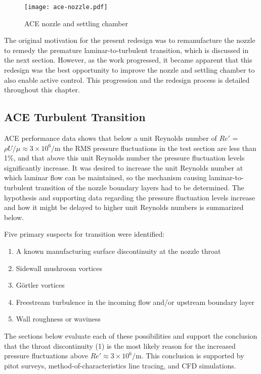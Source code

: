 \begin{figure}[ht!]
    \centering
    \texttt{[image: ace-nozzle.pdf]}
    \caption{ACE nozzle and settling chamber}
    \label{fig:ace-nozzle}
\end{figure}

The original motivation for the present redesign was to remanufacture the nozzle to remedy the premature laminar-to-turbulent transition, which is discussed in the next section. However, as the work progressed, it became apparent that this redesign was the best opportunity to improve the nozzle and settling chamber to also enable active control. This progression and the redesign process is detailed throughout this chapter.

\subsection{ACE Turbulent Transition}

ACE performance data \cite{aceturb,mai-dis,neel-dis,leidy-dis} shows that below a unit Reynolds number of $Re'$ = $\rho U/\mu \approx 3 \times 10^6/\mathrm{m}$ the RMS pressure fluctuations in the test section are less than 1\%, and that above this unit Reynolds number the pressure fluctuation levels significantly increase. It was desired to increase the unit Reynolds number at which laminar flow can be maintained, so the mechanism causing laminar-to-turbulent transition of the nozzle boundary layers had to be determined. The hypothesis and supporting data regarding the pressure fluctuation levels increase and how it might be delayed to higher unit Reynolds numbers is summarized below.

Five primary suspects for transition were identified:

\begin{enumerate}
    \item A known manufacturing surface discontinuity at the nozzle throat
    \item Sidewall mushroom vortices
    \item Görtler vortices
    \item Freestream turbulence in the incoming flow and/or upstream boundary layer
    \item Wall roughness or waviness
\end{enumerate}

The sections below evaluate each of these possibilities and support the conclusion that the throat discontinuity (1) is the most likely reason for the increased pressure fluctuations above $Re' \approx 3 \times 10^6/\mathrm{m}$. This conclusion is supported by pitot surveys, method-of-characteristics line tracing, and CFD simulations. 

